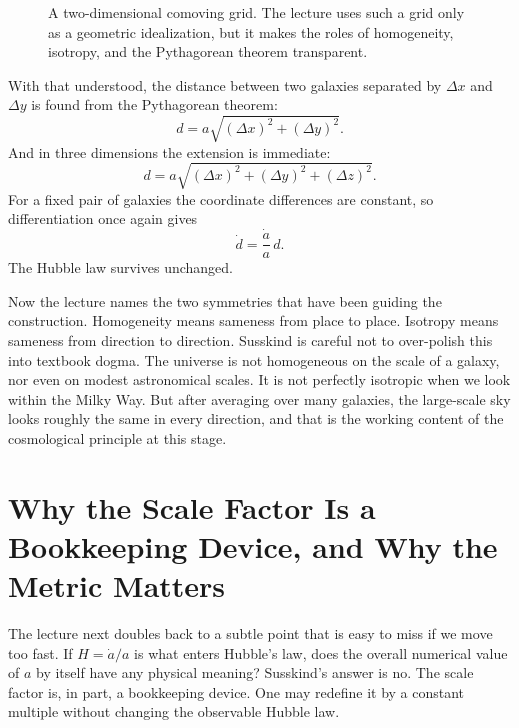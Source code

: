 \begin{figure}
\centering
{}
\caption{A two-dimensional comoving grid. The lecture uses such a grid only as a geometric idealization, but it makes the roles of homogeneity, isotropy, and the Pythagorean theorem transparent.}
\end{figure}

With that understood, the distance between two galaxies separated by \(\Delta x\) and \(\Delta y\) is found from the Pythagorean theorem:
\begin{equation}
d=a\sqrt{(\Delta x)^2+(\Delta y)^2}.
\end{equation}
And in three dimensions the extension is immediate:
\begin{equation}
d=a\sqrt{(\Delta x)^2+(\Delta y)^2+(\Delta z)^2}.
\end{equation}
For a fixed pair of galaxies the coordinate differences are constant, so differentiation once again gives
\begin{equation}
\dot d=\frac{\dot a}{a}\,d.
\end{equation}
The Hubble law survives unchanged.

Now the lecture names the two symmetries that have been guiding the construction. Homogeneity means sameness from place to place. Isotropy means sameness from direction to direction. Susskind is careful not to over-polish this into textbook dogma. The universe is not homogeneous on the scale of a galaxy, nor even on modest astronomical scales. It is not perfectly isotropic when we look within the Milky Way. But after averaging over many galaxies, the large-scale sky looks roughly the same in every direction, and that is the working content of the cosmological principle at this stage.

\section{Why the Scale Factor Is a Bookkeeping Device, and Why the Metric Matters}

The lecture next doubles back to a subtle point that is easy to miss if we move too fast. If \(H=\dot a/a\) is what enters Hubble's law, does the overall numerical value of \(a\) by itself have any physical meaning? Susskind's answer is no. The scale factor is, in part, a bookkeeping device. One may redefine it by a constant multiple without changing the observable Hubble law.

